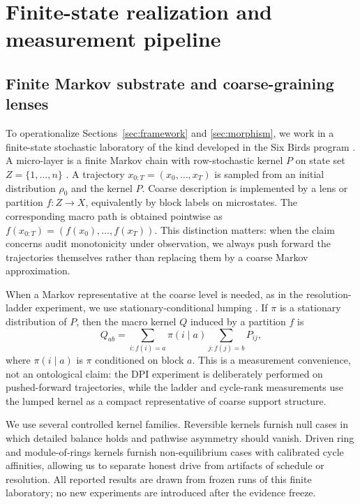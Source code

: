 \section{Finite-state realization and measurement pipeline}\label{sec:methods}

\subsection{Finite Markov substrate and coarse-graining lenses}

To operationalize Sections~\ref{sec:framework} and \ref{sec:morphism}, we work in a finite-state stochastic laboratory of the kind developed in the Six Birds program \cite{tsiokos2026sixbirds,tsiokos2026create}. A micro-layer is a finite Markov chain with row-stochastic kernel \(P\) on state set \(Z=\{1,\dots,n\}\) \cite{kemeny1960finite}. A trajectory \(x_{0:T}=(x_0,\dots,x_T)\) is sampled from an initial distribution \(\rho_0\) and the kernel \(P\). Coarse description is implemented by a lens or partition \(f:Z\to X\), equivalently by block labels on microstates. The corresponding macro path is obtained pointwise as \(f(x_{0:T})=(f(x_0),\dots,f(x_T))\). This distinction matters: when the claim concerns audit monotonicity under observation, we always push forward the trajectories themselves rather than replacing them by a coarse Markov approximation.

When a Markov representative at the coarse level is needed, as in the resolution-ladder experiment, we use stationary-conditional lumping \cite{kemeny1960finite,buchholz1994lumpability}. If \(\pi\) is a stationary distribution of \(P\), then the macro kernel \(Q\) induced by a partition \(f\) is
\[
Q_{ab}=\sum_{i:f(i)=a}\pi(i\mid a)\sum_{j:f(j)=b} P_{ij},
\]
where \(\pi(i\mid a)\) is \(\pi\) conditioned on block \(a\). This is a measurement convenience, not an ontological claim: the DPI experiment is deliberately performed on pushed-forward trajectories, while the ladder and cycle-rank measurements use the lumped kernel as a compact representative of coarse support structure.

We use several controlled kernel families. Reversible kernels furnish null cases in which detailed balance holds and pathwise asymmetry should vanish. Driven ring and module-of-rings kernels furnish non-equilibrium cases with calibrated cycle affinities, allowing us to separate honest drive from artifacts of schedule or resolution. All reported results are drawn from frozen runs of this finite laboratory; no new experiments are introduced after the evidence freeze.

